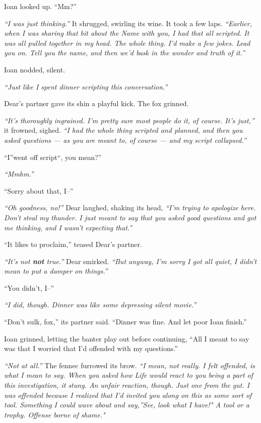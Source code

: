 Ioan looked up. ``Mm?''

\emph{``I was just thinking.''} It shrugged, swirling its wine. It took a few laps. \emph{``Earlier, when I was sharing that bit about the Name with you, I had that all scripted. It was all pulled together in my head. The whole thing. I'd make a few jokes. Lead you on. Tell you the name, and then we'd bask in the wonder and truth of it.''}

Ioan nodded, silent.

\emph{``Just like I spent dinner scripting this conversation.''}

Dear's partner gave its shin a playful kick. The fox grinned.

\emph{``It's thoroughly ingrained. I'm pretty sure most people do it, of course. It's just,''} it frowned, sighed. \emph{``I had the whole thing scripted and planned, and then you asked questions — as you are meant to, of course — and my script collapsed.''}

``I''went off script``, you mean?''

\emph{``Mmhm.''}

``Sorry about that, I--''

\emph{``Oh goodness, no!''} Dear laughed, shaking its head, \emph{``I'm trying to apologize here. Don't steal my thunder. I just meant to say that you asked good questions and got me thinking, and I wasn't expecting that.''}

``It likes to proclaim,'' teased Dear's partner.

\emph{``It's not \textbf{not} true.''} Dear smirked. \emph{``But anyway, I'm sorry I got all quiet, I didn't mean to put a damper on things.''}

``You didn't, I--''

\emph{``I did, though. Dinner was like some depressing silent movie.''}

``Don't sulk, fox,'' its partner said. ``Dinner was fine. And let poor Ioan finish.''

Ioan grinned, letting the banter play out before continuing, ``All I meant to say was that I worried that I'd offended with my questions.''

\emph{``Not at all.''} The fennec furrowed its brow. \emph{``I mean, not really. I felt offended, is what I mean to say. When you asked how Life would react to you being a part of this investigation, it stung. An unfair reaction, though. Just one from the gut. I was offended because I realized that I'd invited you along on this as some sort of tool. Something I could wave about and say,''See, look what I have!" A tool or a trophy. Offense borne of shame."}


